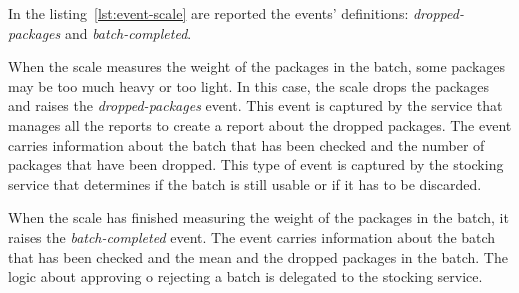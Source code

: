 In the listing~\ref{lst:event-scale} are reported the events' definitions: \textit{dropped-packages} and \textit{batch-completed}.

When the scale measures the weight of the packages in the batch, some packages may be too much heavy or too light.
In this case, the scale drops the packages and raises the \textit{dropped-packages} event.
This event is captured by the service that manages all the reports to create a report about the dropped packages.
The event carries information about the batch that has been checked and the number of packages that have been dropped.
This type of event is captured by the stocking service that determines if the batch is still usable or if it has to be discarded.

When the scale has finished measuring the weight of the packages in the batch, it raises the \textit{batch-completed} event.
The event carries information about the batch that has been checked and the mean and the dropped packages in the batch.
The logic about approving o rejecting a batch is delegated to the stocking service.
